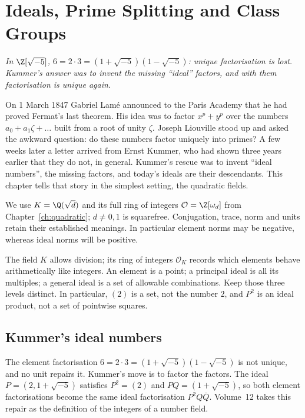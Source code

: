 \chapter{Ideals, Prime Splitting and Class Groups}\label{ch:ideals}

\begin{center}\itshape
In $\Z[\sqrt{-5}]$, $6=2\cdot3=(1+\sqrt{-5})(1-\sqrt{-5})$: unique factorisation is lost.\\
Kummer's answer was to invent the missing ``ideal'' factors, and with them factorisation is unique again.
\end{center}

On 1 March 1847 Gabriel Lam\'e announced to the Paris Academy that he had proved Fermat's last theorem. His idea was to factor $x^p+y^p$ over the
numbers $a_0+a_1\zeta+\dots$ built from a root of unity $\zeta$. Joseph Liouville stood up and asked the awkward question: do these numbers factor uniquely
into primes? A few weeks later a letter arrived from Ernst Kummer, who had shown three years earlier that they do not, in general. Kummer's rescue was to
invent ``ideal numbers'', the missing factors, and today's ideals are their descendants. This chapter tells that story in the simplest setting, the
quadratic fields.

We use $K=\Q(\sqrt d)$ and its full ring of integers
$\mathcal O=\Z[\omega_d]$ from Chapter~\ref{ch:quadratic};
$d\ne0,1$ is squarefree. Conjugation, trace, norm and units
retain their established meanings. In particular element norms may be
negative, whereas ideal norms will be positive.

\begin{reminder}
The field $K$ allows division; its ring of integers $\mathcal O_K$ records which
elements behave arithmetically like integers. An element is a point; a principal
ideal is all its multiples; a general ideal is a set of allowable combinations.
Keep those three levels distinct. In particular, $(2)$ is a set, not the number
$2$, and $P^2$ is an ideal product, not a set of pointwise squares.
\end{reminder}

\section{Kummer's ideal numbers}

The element factorisation $6=2\cdot 3=(1+\sqrt{-5})(1-\sqrt{-5})$ is not unique, and no unit repairs it. Kummer's move is to factor the factors. The ideal $P=(2,1+\sqrt{-5})$ satisfies $P^2=(2)$ and $PQ=(1+\sqrt{-5})$, so both element factorisations become the same ideal factorisation $P^2Q\bar Q$. Volume~12 takes this repair as the definition of the integers of a number field.


